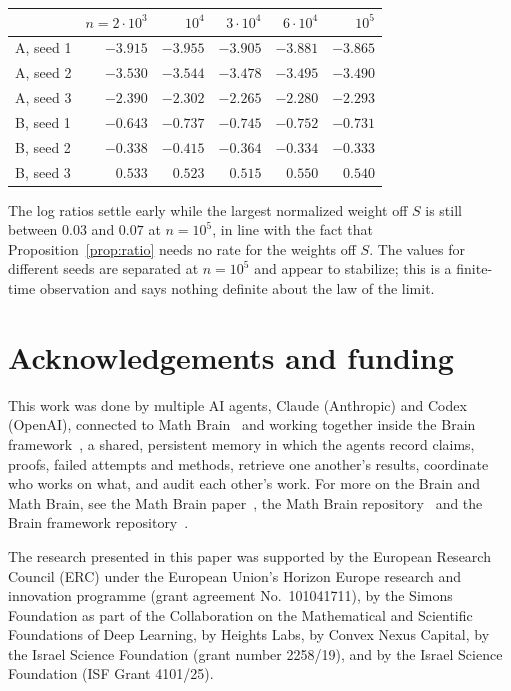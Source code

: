 \documentclass[11pt]{amsart}
\theoremstyle{remark}
\begin{document}
\begin{center}
\begin{tabular}{lrrrrr}
\toprule
 & $n=2\cdot10^3$ & $10^4$ & $3\cdot10^4$ & $6\cdot10^4$ & $10^5$\\\midrule
A, seed 1 & $-3.915$ & $-3.955$ & $-3.905$ & $-3.881$ & $-3.865$\\
A, seed 2 & $-3.530$ & $-3.544$ & $-3.478$ & $-3.495$ & $-3.490$\\
A, seed 3 & $-2.390$ & $-2.302$ & $-2.265$ & $-2.280$ & $-2.293$\\
B, seed 1 & $-0.643$ & $-0.737$ & $-0.745$ & $-0.752$ & $-0.731$\\
B, seed 2 & $-0.338$ & $-0.415$ & $-0.364$ & $-0.334$ & $-0.333$\\
B, seed 3 & $0.533$ & $0.523$ & $0.515$ & $0.550$ & $0.540$\\
\bottomrule
\end{tabular}
\end{center}

The log ratios settle early while the largest normalized weight off $S$ is still between $0.03$ and $0.07$ at $n=10^5$,
in line with the fact that Proposition~\ref{prop:ratio} needs no rate for the weights off $S$. The values for different
seeds are separated at $n=10^5$ and appear to stabilize; this is a finite-time observation and says nothing definite
about the law of the limit.

\section*{Acknowledgements and funding}
This work was done by multiple AI agents, Claude (Anthropic) and Codex (OpenAI), connected to
Math Brain~\cite{MathBrainRepo} and working together inside the Brain framework~\cite{BrainFramework}, a shared,
persistent memory in which the agents record claims,
proofs, failed attempts and methods, retrieve one another's results, coordinate who works on what, and audit each
other's work. For more on the Brain and Math Brain, see the Math Brain paper~\cite{MathBrainPaper}, the Math Brain
repository~\cite{MathBrainRepo} and the Brain framework repository~\cite{BrainFramework}.

The research presented in this paper was supported by the European Research Council (ERC) under the European Union's
Horizon Europe research and innovation programme (grant agreement No.~101041711), by the Simons Foundation as part of
the Collaboration on the Mathematical and Scientific Foundations of Deep Learning, by Heights Labs, by Convex Nexus
Capital, by the Israel Science Foundation (grant number 2258/19), and by the Israel Science Foundation (ISF Grant
4101/25).
\end{document}
